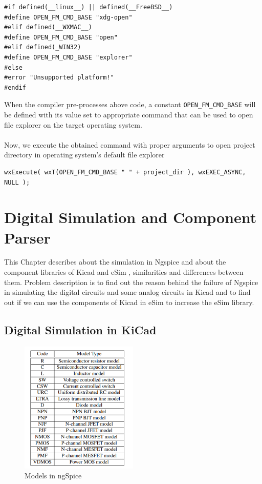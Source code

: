 \documentclass[12pt,a4paper]{report}
\begin{document}
\begin{verbatim}
#if defined(__linux__) || defined(__FreeBSD__)
#define OPEN_FM_CMD_BASE "xdg-open"
#elif defined(__WXMAC__)
#define OPEN_FM_CMD_BASE "open"
#elif defined(_WIN32)
#define OPEN_FM_CMD_BASE "explorer"
#else
#error "Unsupported platform!"
#endif
\end{verbatim}

When the compiler pre-processes above code, a constant \texttt{OPEN\_FM\_CMD\_BASE} will be defined with its value set to appropriate command that can be used to open file explorer on the target operating system.\\
\\
Now, we execute the obtained command with proper arguments to open project directory in operating system's default file explorer
\begin{verbatim}
wxExecute( wxT(OPEN_FM_CMD_BASE " " + project_dir ), wxEXEC_ASYNC, NULL );
\end{verbatim}

\chapter{\textbf{Digital Simulation and Component Parser}}
This Chapter describes about the simulation in Ngspice and about the component libraries of Kicad and eSim , similarities and differences between them. Problem description is to find out the reason behind the failure of Ngspice in simulating the digital circuits and some analog circuits in Kicad and to find out if we can use the components of Kicad in eSim to increase the eSim library.
\section{Digital Simulation in KiCad}

\begin{figure} %
	\centering
	\includegraphics[width=0.5\textwidth]{models}
	\caption{Models in ngSpice}
\end{figure}
\end{document}
